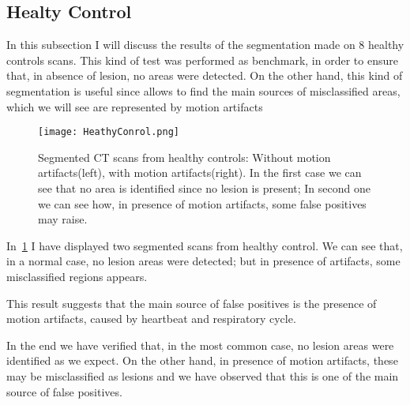 
	\subsection{Healty Control}
	
	In this subsection I will discuss the results of the segmentation made on $8$ healthy controls scans. This kind of  test was performed as benchmark, in order to ensure that, in absence of lesion, no areas were detected. On the other hand, this kind of segmentation is useful since allows to find the main sources of misclassified areas, which we will see are represented by motion artifacts
	
	\begin{figure}[h!]
		\centering
			\texttt{[image: HeathyConrol.png]}
			\caption{Segmented CT scans from healthy controls: Without motion artifacts(left), with motion artifacts(right). In the first case we can see that no area is identified since no lesion is present; In second one we can see how, in presence of motion artifacts, some false positives may raise.  }\label{fig:HealthyControl}
	\end{figure}

	In \figurename\,\ref{fig:HealthyControl} I have displayed two segmented scans from healthy control. We can see that, in a normal case, no lesion areas were detected; but in presence of artifacts, some misclassified regions appears.
	
	This result suggests that the main source of false positives is the presence of motion artifacts, caused by heartbeat and respiratory cycle.
	
	In the end we have verified that, in the most common case, no lesion areas were identified as we expect. On the other hand, in presence of motion artifacts, these may be misclassified as lesions and we have observed that this is one of the main source of false positives. 
	
	
	

